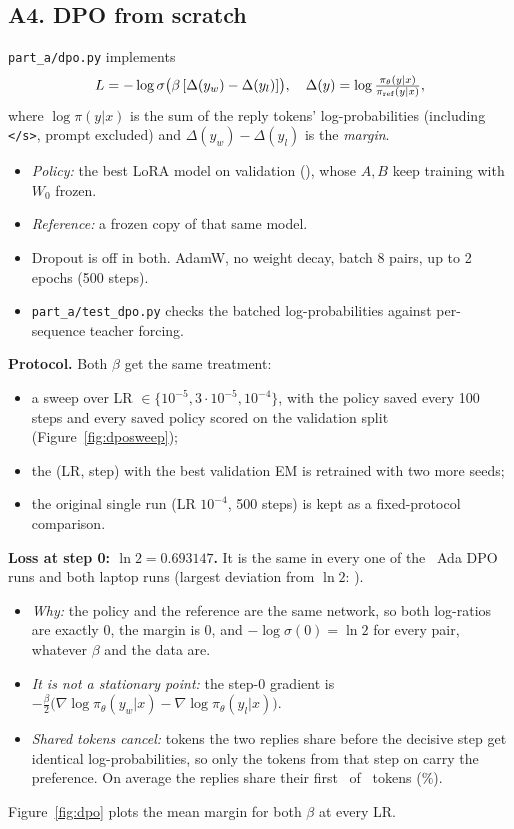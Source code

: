 \subsection*{A4. DPO from scratch}
\texttt{part\_a/dpo.py} implements
\[ L=-\log\sigma\big(\beta\,[\Delta(y_w)-\Delta(y_l)]\big),\quad \Delta(y)=\log\tfrac{\pi_\theta(y|x)}{\pi_{\rm ref}(y|x)}, \]
where $\log\pi(y|x)$ is the sum of the reply tokens' log-probabilities (including \texttt{</s>}, prompt excluded) and $\Delta(y_w)-\Delta(y_l)$ is the \emph{margin}.
\begin{itemize}[leftmargin=*,nosep]
\item \emph{Policy:} the best LoRA model on validation (\AdaBest), whose $A,B$ keep training with $W_0$ frozen.
\item \emph{Reference:} a frozen copy of that same model.
\item Dropout is off in both. AdamW, no weight decay, batch 8 pairs, up to 2 epochs (500 steps).
\item \texttt{part\_a/test\_dpo.py} checks the batched log-probabilities against per-sequence teacher forcing.
\end{itemize}

\textbf{Protocol.} Both $\beta$ get the same treatment:
\begin{itemize}[leftmargin=*,nosep]
\item a sweep over LR $\in\{10^{-5},3\cdot10^{-5},10^{-4}\}$, with the policy saved every 100 steps and every saved policy scored on the validation split (Figure~\ref{fig:dposweep});
\item the (LR, step) with the best validation EM is retrained with two more seeds;
\item the original single run (LR $10^{-4}$, 500 steps) is kept as a fixed-protocol comparison.
\end{itemize}

\textbf{Loss at step 0: $\ln 2=0.693147$.} It is the same in every one of the \AdaStepZeroRuns\ Ada DPO runs and both laptop runs (largest deviation from $\ln2$: \AdaStepZeroDev).
\begin{itemize}[leftmargin=*,nosep]
\item \emph{Why:} the policy and the reference are the same network, so both log-ratios are exactly 0, the margin is 0, and $-\log\sigma(0)=\ln2$ for every pair, whatever $\beta$ and the data are.
\item \emph{It is not a stationary point:} the step-0 gradient is $-\frac{\beta}{2}\big(\nabla\log\pi_\theta(y_w|x)-\nabla\log\pi_\theta(y_l|x)\big)$.
\item \emph{Shared tokens cancel:} tokens the two replies share before the decisive step get identical log-probabilities, so only the tokens from that step on carry the preference. On average the replies share their first \PairSharedTok\ of \PairReplyTok\ tokens (\PairSharedPct\%).
\end{itemize}
Figure~\ref{fig:dpo} plots the mean margin for both $\beta$ at every LR.

